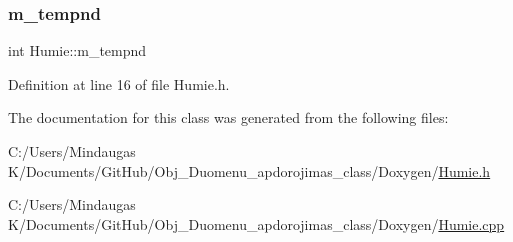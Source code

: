 \subsubsection{\texorpdfstring{m\_tempnd}{m\_tempnd}}
{\footnotesize\ttfamily int Humie\+::m\+\_\+tempnd\hspace{0.3cm}{\ttfamily [protected]}}



Definition at line 16 of file Humie.\+h.



The documentation for this class was generated from the following files\+:\begin{DoxyCompactItemize}
\item 
C\+:/\+Users/\+Mindaugas K/\+Documents/\+Git\+Hub/\+Obj\+\_\+\+Duomenu\+\_\+apdorojimas\+\_\+class/\+Doxygen/\mbox{\hyperlink{_humie_8h}{Humie.\+h}}\item 
C\+:/\+Users/\+Mindaugas K/\+Documents/\+Git\+Hub/\+Obj\+\_\+\+Duomenu\+\_\+apdorojimas\+\_\+class/\+Doxygen/\mbox{\hyperlink{_humie_8cpp}{Humie.\+cpp}}\end{DoxyCompactItemize}
